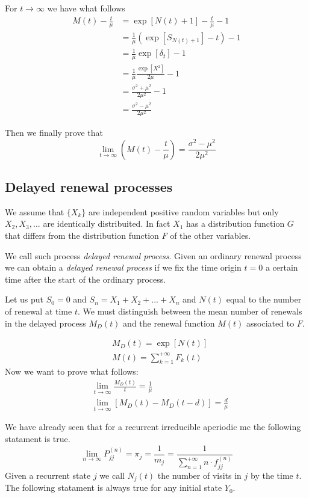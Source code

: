 For $t \rightarrow \infty$ we have what follows
\begin{align*}
	M(t)-\frac{t}{\mu} & =\exp[N(t)+1]-\frac{t}{\mu}-1 \\
	& = \frac{1}{\mu} (\exp[S_{N(t)+1}]-t)-1 \\
	& = \frac{1}{\mu} \exp[\delta_t]-1 \\
	& = \frac{1}{\mu}\frac{\exp[X^2]}{2\mu}-1 \\
	& = \frac{\sigma^2+\mu^2}{2\mu^2}-1 \\
	& = \frac{\sigma^2-\mu^2}{2\mu^2}
\end{align*}

Then we finally prove that
\begin{equation}
	\lim_{t \rightarrow \infty} \left( M(t) - \frac{t}{\mu} \right) = \frac{\sigma^2-\mu^2}{2\mu^2}
\end{equation}

\subsection{Delayed renewal processes}
	We assume that $\{X_k\}$ are independent positive random variables but only $X_2,X_3,...$ are identically distribuited.
	In fact $X_1$ has a distribution function $G$ that differs from the distribution function $F$ of the other variables.

	We call such process \textit{delayed renewal process}. Given an ordinary renewal process we can obtain a \textit{delayed renewal process} if we fix the time origin $t=0$ a certain time after the start of the ordinary process.

	Let us put $S_0=0$ and $S_n=X_1+X_2+...+X_n$ and $N(t)$ equal to the number of renewal at time $t$. We must distinguish between the mean number of renewals in the delayed process $M_D(t)$ and the renewal function  $M(t)$ associated to $F$.

	\begin{align}
		& M_D(t) = \exp[N(t)]
		\\ & M(t) = \sum_{k=1}^{+\infty}F_k(t)
	\end{align}
	Now we want to prove what follows:
	\begin{align*}
		& \lim_{t \to \infty }\frac{M_D(t)}{t}=\frac{1}{\mu}
		\\ & \lim_{t \to \infty }[M_D(t)-M_D(t-d)]=\frac{d}{\mu}
	\end{align*}

	We have already seen that for a recurrent irreducible aperiodic \gls{mc} the following statament is true.
	\begin{equation}
		\lim_{n \to \infty} P_{jj}^{(n)}=\pi_j=\frac{1}{m_j}=\frac{1}{\sum\limits_{n=1}^{+\infty}n \cdot f_{jj}^{(n)}}
	\end{equation}
	Given a recurrent state $j$ we call $N_j(t)$ the number of visits in $j$ by the time $t$. The following statament is always true for any initial state $Y_0$.

